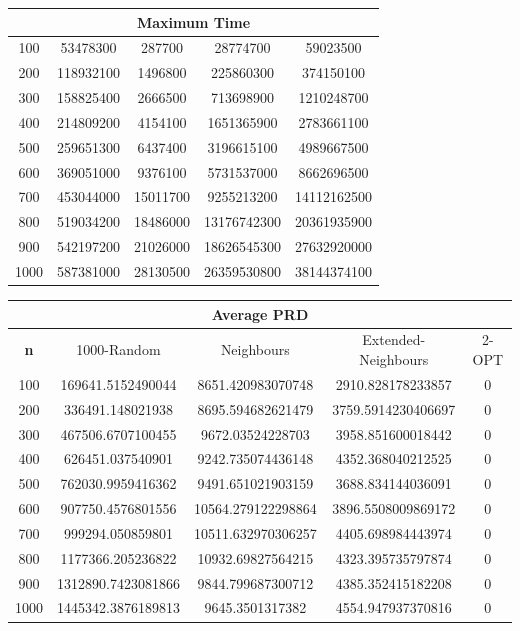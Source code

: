 \documentclass{article}
\begin{document}
\begin{center}
\begin{tabular}{|c|c|c|c|c|}
\hline
\multicolumn{5}{|c|}{\textbf{Maximum Time}}\\
\hline
100 & 53478300 & 287700 & 28774700 & 59023500\\
\hline
200 & 118932100 & 1496800 & 225860300 & 374150100\\
\hline
300 & 158825400 & 2666500 & 713698900 & 1210248700\\
\hline
400 & 214809200 & 4154100 & 1651365900 & 2783661100\\
\hline
500 & 259651300 & 6437400 & 3196615100 & 4989667500\\
\hline
600 & 369051000 & 9376100 & 5731537000 & 8662696500\\
\hline
700 & 453044000 & 15011700 & 9255213200 & 14112162500\\
\hline
800 & 519034200 & 18486000 & 13176742300 & 20361935900\\
\hline
900 & 542197200 & 21026000 & 18626545300 & 27632920000\\
\hline
1000 & 587381000 & 28130500 & 26359530800 & 38144374100\\
\hline
\end{tabular}
\end{center}

\begin{center}
\begin{tabular}{|c|c|c|c|c|}
\hline
\multicolumn{5}{|c|}{\textbf{Average PRD}}\\
\hline
\textbf{n} & 1000-Random & Neighbours & Extended-Neighbours & 2-OPT\\
\hline
100 & 169641.5152490044 & 8651.420983070748 & 2910.828178233857 & 0\\
\hline
200 & 336491.148021938 & 8695.594682621479 & 3759.5914230406697 & 0\\
\hline
300 & 467506.6707100455 & 9672.03524228703 & 3958.851600018442 & 0\\
\hline
400 & 626451.037540901 & 9242.735074436148 & 4352.368040212525 & 0\\
\hline
500 & 762030.9959416362 & 9491.651021903159 & 3688.834144036091 & 0\\
\hline
600 & 907750.4576801556 & 10564.279122298864 & 3896.5508009869172 & 0\\
\hline
700 & 999294.050859801 & 10511.632970306257 & 4405.698984443974 & 0\\
\hline
800 & 1177366.205236822 & 10932.69827564215 & 4323.395735797874 & 0\\
\hline
900 & 1312890.7423081866 & 9844.799687300712 & 4385.352415182208 & 0\\
\hline
1000 & 1445342.3876189813 & 9645.3501317382 & 4554.947937370816 & 0\\
\hline
\end{tabular}
\end{center}
\end{document}
